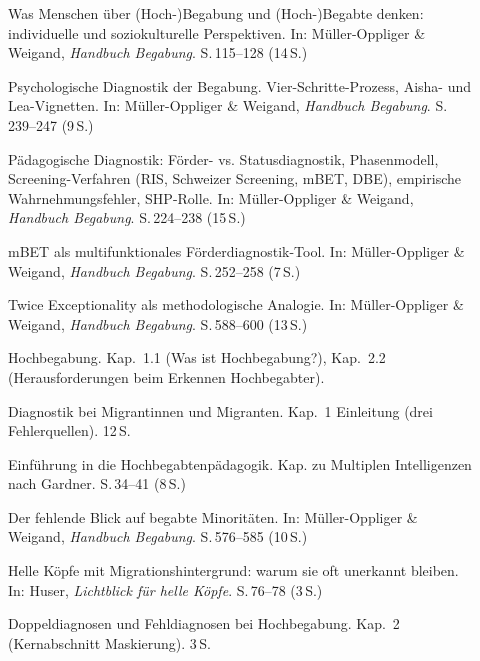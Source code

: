 \documentclass[ngerman, a4paper]{article}
\begin{document}
\begin{description}
  \item[\cite{baudson2021wasdenken}] Was Menschen über (Hoch-)Begabung und
    (Hoch-)Begabte denken: individuelle und soziokulturelle Perspektiven.
    In: Müller-Oppliger \& Weigand, \textit{Handbuch Begabung}.
    S.\,115--128 (14\,S.)
  \item[\cite{gauckreimann2021psychdiagnostik}] Psychologische Diagnostik der
    Begabung. Vier-Schritte-Prozess, Aisha- und Lea-Vignetten.
    In: Müller-Oppliger \& Weigand, \textit{Handbuch Begabung}.
    S.\,239--247 (9\,S.)
  \item[\cite{muelleroppliger2021paeddiagnostik}] Pädagogische Diagnostik:
    Förder- vs. Statusdiagnostik, Phasenmodell, Screening-Verfahren (RIS,
    Schweizer Screening, mBET, DBE), empirische Wahrnehmungsfehler,
    SHP-Rolle.
    In: Müller-Oppliger \& Weigand, \textit{Handbuch Begabung}.
    S.\,224--238 (15\,S.)
  \item[\cite{stahl2021mbet}] mBET als multifunktionales Förderdiagnostik-Tool.
    In: Müller-Oppliger \& Weigand, \textit{Handbuch Begabung}.
    S.\,252--258 (7\,S.)
  \item[\cite{baumschader2021twice}] Twice Exceptionality als methodologische Analogie.
    In: Müller-Oppliger \& Weigand, \textit{Handbuch Begabung}.
    S.\,588--600 (13\,S.)
  \item[\cite{preckel2013hochbegabung}] Hochbegabung.
    Kap.~1.1 (Was ist Hochbegabung?), Kap.~2.2 (Herausforderungen beim Erkennen Hochbegabter).
  \item[\cite{maehler2018diagnostik}] Diagnostik bei Migrantinnen und Migranten.
    Kap.~1 Einleitung (drei Fehlerquellen). 12\,S.
  \item[\cite{trautmann2016einfuehrung}] Einführung in die
    Hochbegabtenpädagogik. Kap. zu Multiplen Intelligenzen nach Gardner.
    S.\,34--41 (8\,S.)
  \item[\cite{stamm2021fehlenderblick}] Der fehlende Blick auf begabte Minoritäten.
    In: Müller-Oppliger \& Weigand, \textit{Handbuch Begabung}. S.\,576--585 (10\,S.)
  \item[\cite{kellerkoller2021hellekoepfe}] Helle Köpfe mit Migrationshintergrund:
    warum sie oft unerkannt bleiben. In: Huser, \textit{Lichtblick für helle Köpfe}.
    S.\,76--78 (3\,S.)
  \item[\cite{webb2020doppeldiagnosen}] Doppeldiagnosen und Fehldiagnosen bei
    Hochbegabung. Kap.~2 (Kernabschnitt Maskierung). 3\,S.
\end{description}
 
\end{document}
